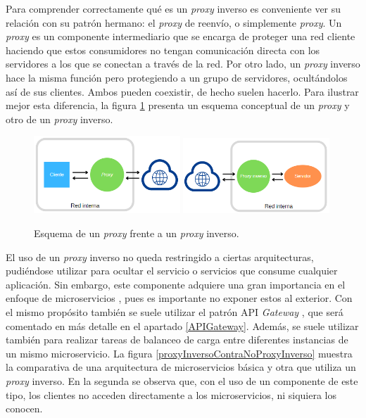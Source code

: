 \documentclass[11pt,spanish,listoffigures]{tfgetsinf}
\begin{document}
Para comprender correctamente qué es un \emph{proxy} inverso es conveniente ver su relación con su patrón hermano: el \emph{proxy} de reenvío, o simplemente \emph{proxy}. Un \emph{proxy} es un componente intermediario que se encarga de proteger una red cliente haciendo que estos consumidores no tengan comunicación directa con los servidores a los que se conectan a través de la red. Por otro lado, un \emph{proxy} inverso hace la misma función pero protegiendo a un grupo de servidores, ocultándolos así de sus clientes. Ambos pueden coexistir, de hecho suelen hacerlo. Para ilustrar mejor esta diferencia, la figura \ref{proxyContraProxyInverso} presenta un esquema conceptual de un \emph{proxy} y otro de un \emph{proxy} inverso.

\begin{figure}[ht]
\centering
\includegraphics[width=0.49\textwidth]{imagenes/proxy}
\includegraphics[width=0.49\textwidth]{imagenes/proxyInverso}
\caption{Esquema de un \emph{proxy} frente a un \emph{proxy} inverso.}
	\label{proxyContraProxyInverso}
\end{figure}

El uso de un \emph{proxy} inverso no queda restringido a ciertas arquitecturas, pudiéndose utilizar para ocultar el servicio o servicios que consume cualquier aplicación. Sin embargo, este componente adquiere una gran importancia en el enfoque de microservicios \cite{ReverseProxyForMicroservices}, pues es importante no exponer estos al exterior. Con el mismo propósito también se suele utilizar el patrón API \emph{Gateway} \cite{APIGatewayParaMicroservicios}, que será comentado en más detalle en el apartado \ref{APIGateway}. Además, se suele utilizar también para realizar tareas de balanceo de carga entre diferentes instancias de un mismo microservicio. La figura \ref{proxyInversoContraNoProxyInverso} muestra la comparativa de una arquitectura de microservicios básica y otra que utiliza un \emph{proxy} inverso. En la segunda se observa que, con el uso de un componente de este tipo, los clientes no acceden directamente a los microservicios, ni siquiera los conocen.
\end{document}
